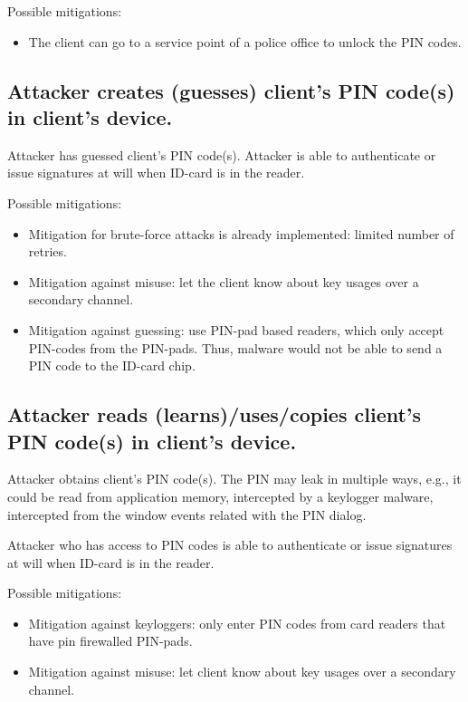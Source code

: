 Possible mitigations:
\begin{itemize}
\item The client can go to a service point of a police office to unlock the PIN codes.
\end{itemize}




\subsection{Attacker creates (guesses) client's PIN code(s) in client's device.}
Attacker has guessed client's PIN code(s). Attacker is able to authenticate or issue signatures at will when ID-card is in the reader.

Possible mitigations:
\begin{itemize}
	\item Mitigation for brute-force attacks is already implemented: limited number of retries.
	\item Mitigation against misuse: let the client know about key usages over a secondary channel.
	\item Mitigation against guessing: use PIN-pad based readers, which only accept PIN-codes from the PIN-pads. Thus, malware would not be able to send a PIN code to the ID-card chip.
\end{itemize}


\subsection{Attacker reads (learns)/uses/copies client's PIN code(s) in client's device.}
\label{threat:read-pin}
Attacker obtains client's PIN code(s). The PIN may leak in multiple ways, e.g., it could be read from application memory, intercepted by a keylogger malware, intercepted from the window events related with the PIN dialog. 

Attacker who has access to PIN codes is able to authenticate or issue signatures at will when ID-card is in the reader.

Possible mitigations:
\begin{itemize}
	\item Mitigation against keyloggers: only enter PIN codes from card readers that have pin firewalled PIN-pads.
	\item Mitigation against misuse: let client know about key usages over a secondary channel.
\end{itemize}


